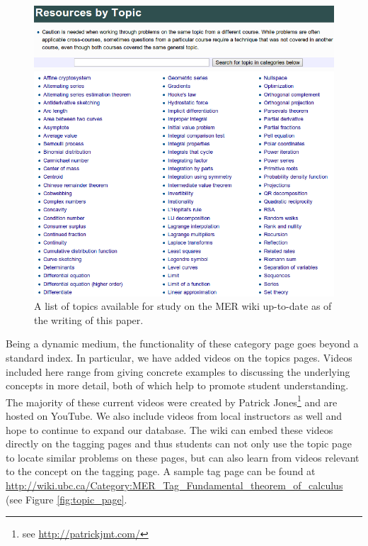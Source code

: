 \documentclass{primus}
\begin{document}
\begin{figure}[H]
\centering
\includegraphics[width=\textwidth]{figs/Tag_List.png}
\caption{A list of topics available for study on the MER wiki up-to-date as of the writing of this paper.}\label{fig:wiki_tags}
\end{figure}

\noindent{}Being a dynamic medium, the functionality of these category page goes beyond a standard index. In particular, we have added videos on the topics pages. Videos included here range from giving concrete examples to discussing the underlying concepts in more detail, both of which help to promote student understanding. The majority of these current videos were created by Patrick Jones\footnote{see \url{http://patrickjmt.com/}} and are hosted on YouTube. We also include videos from local instructors as well and hope to continue to expand our database. The wiki can embed these videos directly on the tagging pages and thus students can not only use the topic page to locate similar problems on these pages, but can also learn from videos relevant to the concept on the tagging page.  A sample tag page can be found at \url{http://wiki.ubc.ca/Category:MER_Tag_Fundamental_theorem_of_calculus} (see Figure \ref{fig:topic_page}.
\end{document}
